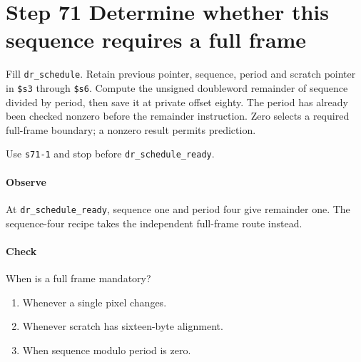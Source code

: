 \section{Step 71 Determine whether this sequence requires a full frame}
Fill \texttt{dr\_schedule}. Retain previous pointer, sequence, period and scratch pointer in \texttt{\$s3} through \texttt{\$s6}. Compute the unsigned doubleword remainder of sequence divided by period, then save it at private offset eighty. The period has already been checked nonzero before the remainder instruction. Zero selects a required full-frame boundary; a nonzero result permits prediction.

Use \texttt{s71-1} and stop before \texttt{dr\_schedule\_ready}.

\paragraph{Observe} At \texttt{dr\_schedule\_ready}, sequence one and period four give remainder one. The sequence-four recipe takes the independent full-frame route instead.

\paragraph{Check} When is a full frame mandatory?
\begin{enumerate}[label=\Alph*.]
  \item Whenever a single pixel changes.
  \item Whenever scratch has sixteen-byte alignment.
  \item When sequence modulo period is zero.
\end{enumerate}
